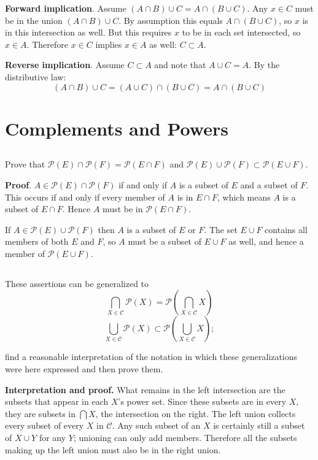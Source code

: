 \documentclass{article}
\begin{document}
\textbf{Forward implication}. Assume $(A \cap B) \cup C = A \cap (B \cup C)$. Any $x \in C$ must be in the union $(A \cap B) \cup C$. By assumption this equals $A \cap (B \cup C)$, so $x$ is in this intersection as well. But this requires $x$ to be in each set intersected, so $x \in A$. Therefore $x \in C$ implies $x \in A$ as well: $C \subset A$.

\textbf{Reverse implication}. Assume $C \subset A$ and note that $A \cup C = A$. By the distributive law:
$$(A \cap B) \cup C = (A \cup C) \cap (B \cup C) = A \cap (B \cup C)$$

\section{Complements and Powers}

\subsection{} Prove that $\mathscr{P}(E) \cap \mathscr{P}(F) = \mathscr{P}(E \cap F)$ and $\mathscr{P}(E) \cup \mathscr{P}(F) \subset \mathscr{P}(E \cup F)$.

\textbf{Proof}. $A \in \mathscr{P}(E) \cap \mathscr{P}(F)$ if and only if $A$ is a subset of $E$ and a subset of $F$. This occurs if and only if every member of $A$ is in $E \cap F$, which means $A$ is a subset of $E \cap F$. Hence $A$ must be in $\mathscr{P}(E \cap F)$.

If $A \in \mathscr{P}(E) \cup \mathscr{P}(F)$ then $A$ is a subset of $E$ or $F$. The set $E \cup F$ contains all members of both $E$ and $F$, so $A$ must be a subset of $E \cup F$ as well, and hence a member of $\mathscr{P}(E \cup F)$. 

\subsection{} These assertions can be generalized to 
$$ \bigcap_{X \in \mathcal{C}} \mathscr{P}(X) = \mathscr{P}\left(\bigcap_{X \in \mathcal{C}} X\right)$$
$$ \bigcup_{X \in \mathcal{C}} \mathscr{P}(X) \subset \mathscr{P}\left(\bigcup_{X \in \mathcal{C}} X\right);$$

find a reasonable interpretation of the notation in which these generalizations were here expressed and then prove them.

\textbf{Interpretation and proof.} What remains in the left intersection are the subsets that appear in each $X$'s power set. Since these subsets are in every $X$, they are subsets in $\bigcap X$, the intersection on the right. The left union collects every subset of every $X$ in $\mathcal{C}$. Any such subset of an $X$ is certainly still a subset of $X \cup Y$ for any  $Y$; unioning can only add members. Therefore all the subsets making up the left union must also be in the right union.
\end{document}
